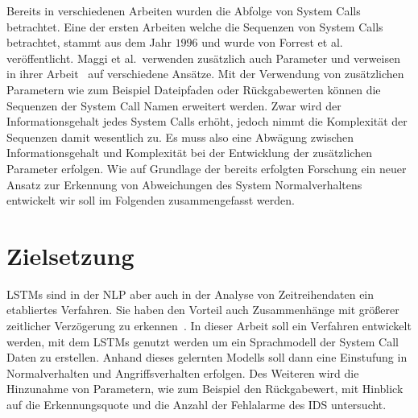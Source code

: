 Bereits in verschiedenen Arbeiten wurden die Abfolge von System Calls betrachtet.
Eine der ersten Arbeiten welche die Sequenzen von System Calls betrachtet, stammt aus dem Jahr $1996$ und wurde von Forrest et al.~\cite{FORREST} veröffentlicht.
Maggi et al.\ verwenden zusätzlich auch Parameter und verweisen in ihrer Arbeit~\cite{MAGGI} auf verschiedene Ansätze.
Mit der Verwendung von zusätzlichen Parametern wie zum Beispiel Dateipfaden oder Rückgabewerten können die Sequenzen der System Call Namen erweitert werden.
Zwar wird der Informationsgehalt jedes System Calls erhöht, jedoch nimmt die Komplexität der Sequenzen damit wesentlich zu. 
Es muss also eine Abwägung zwischen Informationsgehalt und Komplexität bei der Entwicklung der zusätzlichen Parameter erfolgen.
Wie auf Grundlage der bereits erfolgten Forschung ein neuer Ansatz zur Erkennung von Abweichungen des System Normalverhaltens entwickelt wir soll im Folgenden zusammengefasst werden.





\section{Zielsetzung}\label{sec:Forschungsfrage}

\acp{LSTM} sind in der \ac{NLP} aber auch in der Analyse von Zeitreihendaten ein etabliertes Verfahren.
Sie haben den Vorteil auch Zusammenhänge mit größerer zeitlicher Verzögerung zu erkennen~\cite{HOCHREITER}.
In dieser Arbeit soll ein Verfahren entwickelt werden, mit dem \acp{LSTM} genutzt werden um ein Sprachmodell der System Call Daten zu erstellen.
Anhand dieses gelernten Modells soll dann eine Einstufung in Normalverhalten und Angriffsverhalten erfolgen.
Des Weiteren wird die Hinzunahme von Parametern, wie zum Beispiel den Rückgabewert, mit Hinblick auf die Erkennungsquote und die Anzahl der Fehlalarme des \ac{IDS} untersucht.

